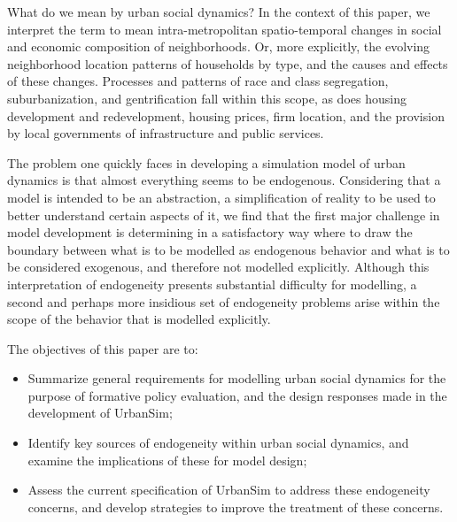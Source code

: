 \documentclass[12pt,a4paper]{article}
\begin{document}
What do we mean by urban social dynamics? In the context of this
paper, we interpret the term to mean intra-metropolitan
spatio-temporal changes in social and economic composition of
neighborhoods. Or, more explicitly, the evolving neighborhood
location patterns of households by type, and the causes and
effects of these changes. Processes and patterns of race and class
segregation, suburbanization, and gentrification fall within this
scope, as does housing development and redevelopment, housing
prices, firm location, and the provision by local governments of
infrastructure and public services.

The problem one quickly faces in developing a simulation model of
urban dynamics is that almost everything seems to be endogenous.
Considering that a model is intended to be an abstraction, a
simplification of reality to be used to better understand certain
aspects of it, we find that the first major challenge in model
development is determining in a satisfactory way where to draw the
boundary between what is to be modelled as endogenous behavior and
what is to be considered exogenous, and therefore not modelled
explicitly.  Although this interpretation of endogeneity presents
substantial difficulty for modelling, a second and perhaps more
insidious set of endogeneity problems arise within the scope of
the behavior that is modelled explicitly.

The objectives of this paper are to:

\begin{itemize}
\item  Summarize general requirements for modelling urban social
dynamics for the purpose of formative policy evaluation, and the
design responses made in the development of UrbanSim;

\item Identify key sources of endogeneity within urban social
dynamics, and examine the implications of these for model design;

\item Assess the current specification of UrbanSim to address
these endogeneity concerns, and develop strategies to improve the
treatment of these concerns.

\end{itemize}
\end{document}

